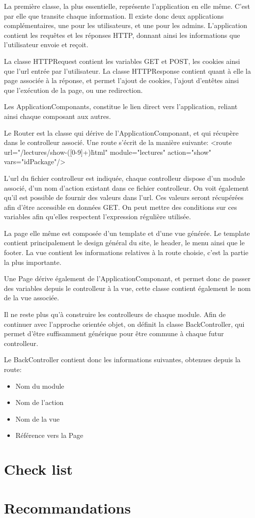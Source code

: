     La première classe, la plus essentielle, représente l'application en elle même. C'est par elle que transite chaque information.
    Il existe donc deux applications complémentaires, une pour les utilisateurs, et une pour les admins.
    L'application contient les requêtes et les réponses HTTP, donnant ainsi les informations que l'utilisateur envoie et reçoit.

    La classe HTTPRequest contient les variables GET et POST, les cookies ainsi que l'url entrée par l'utilisateur.
    La classe HTTPResponse contient quant à elle la page associée à la réponse, et permet l'ajout de cookies, l'ajout d'entêtes
    ainsi que l'exécution de la page, ou une redirection.

    Les ApplicationComponants, constitue le lien direct vers l'application, reliant ainsi chaque composant aux autres.

    Le Router est la classe qui dérive de l'ApplicationComponant, et qui récupère dans le controlleur associé.
    Une route s'écrit de la manière suivante:
    <route url="/lectures/show-([0-9]+)\.html" module="lectures" action="show" vars="idPackage"/>

    L'url du fichier controlleur est indiquée, chaque controlleur dispose d'un module associé, d'un nom d'action existant dans ce
    fichier controlleur. On voit également qu'il est possible de fournir des valeurs dans l'url. Ces valeurs seront récupérées afin
    d'être accessible en données GET. On peut mettre des conditions sur ces variables afin qu'elles respectent l'expression régulière
    utilisée.

    La page elle même est composée d'un template et d'une vue générée.
    Le template contient principalement le design général du site, le header, le menu ainsi que le footer.
    La vue contient les informations relatives à la route choisie, c'est la partie la plus importante.

    Une Page dérive également de l'ApplicationComponant, et permet donc de passer des variables depuis le controlleur à la vue,
    cette classe contient également le nom de la vue associée.

    Il ne reste plus qu'à construire les controlleurs de chaque module.
    Afin de continuer avec l'approche orientée objet, on définit la classe BackController, qui permet d'être
    suffisamment générique pour être commune à chaque futur controlleur.

    Le BackController contient donc les informations suivantes, obtenues depuis la route:

    \begin{itemize}
    \item Nom du module
    \item Nom de l'action
    \item Nom de la vue
    \item Référence vers la Page
    \end{itemize}

        
        \cite{ref_framework_mvc}

    \section{Check list}
    \section{Recommandations}

